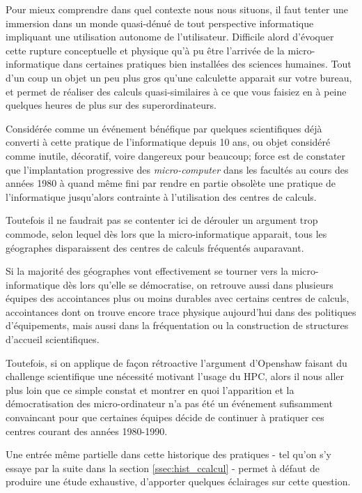 Pour mieux comprendre dans quel contexte nous nous situons, il faut tenter une immersion dans un monde quasi-dénué de tout perspective informatique impliquant une utilisation autonome de l'utilisateur. Difficile alord d'évoquer cette rupture conceptuelle et physique qu'à pu être l'arrivée de la micro-informatique dans certaines pratiques bien installées des sciences humaines. Tout d'un coup un objet un peu plus gros qu'une calculette apparait sur votre bureau, et permet de réaliser des calculs quasi-similaires à ce que vous faisiez en à peine quelques heures de plus sur des superordinateurs.

Considérée comme un événement bénéfique par quelques scientifiques déjà converti à cette pratique de l'informatique depuis 10 ans, ou objet considéré comme inutile, décoratif, voire dangereux pour beaucoup; force est de constater que l'implantation progressive des \textit{micro-computer} dans les facultés au cours des années 1980 à quand même fini par rendre en partie obsolète une pratique de l’informatique jusqu'alors contrainte à l'utilisation des centres de calculs.

Toutefois il ne faudrait pas se contenter ici de dérouler un argument trop commode, selon lequel dès lors que la micro-informatique apparait, tous les géographes disparaissent des centres de calculs fréquentés auparavant.

Si la majorité des géographes vont effectivement se tourner vers la micro-informatique dès lors qu'elle se démocratise, on retrouve aussi dans plusieurs équipes des accointances plus ou moins durables avec certains centres de calculs, accointances dont on trouve encore trace physique aujourd'hui dans des politiques d'équipements, mais aussi dans la fréquentation ou la construction de structures d'accueil scientifiques.

Toutefois, si on applique de façon rétroactive l'argument d'Openshaw faisant du challenge scientifique une nécessité motivant l'usage du HPC, alors il nous aller plus loin que ce simple constat et montrer en quoi l'apparition et la démocratisation des micro-ordinateur n'a pas été un événement sufisamment convaincant pour que certaines équipes décide de continuer à pratiquer ces centres courant des années 1980-1990.

Une entrée même partielle dans cette historique des pratiques - tel qu'on s'y essaye par la suite dans la section \ref{ssec:hist_ccalcul} - permet à défaut de produire une étude exhaustive, d'apporter quelques éclairages sur cette question.

